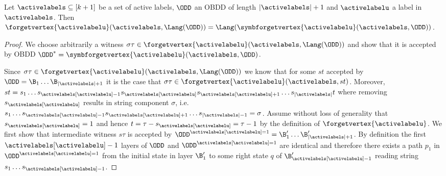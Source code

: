 \begin{lemma}
\label{lemma:SymbolicForgetVertexAppendix}
Let $\activelabels \subseteq [k+1]$ be a set of active labels, $\ODD$ an OBDD of length $|\activelabels|+1$ and $\activelabelu$ a label in $\activelabels$. Then  $\forgetvertex{\activelabelu}(\activelabels, \Lang(\ODD))  = \Lang(\symbforgetvertex{\activelabelu}(\activelabels, \ODD))$.
\end{lemma}

\begin{proof}
    We choose arbitrarily a  witness $\sigma\tau\in \forgetvertex{\activelabelu}(\activelabels,\Lang(\ODD))$ and show that it is accepted by OBDD $\ODD^* = \symbforgetvertex{\activelabelu}(\activelabels,\ODD)$.

    Since $\sigma\tau \in \forgetvertex{\activelabelu}(\activelabels,\Lang(\ODD))$ we know that for some $st$ accepted by $\ODD = \B_1\dots \B_{|\activelabels|+1}$ it is the case that $\sigma\tau \in \forgetvertex{\activelabelu}(\activelabels,st)$. Moreover, $st = s_1\dots s_{\activelabels[\activelabelu]-1}s_{\activelabels[\activelabelu]}s_{\activelabels[\activelabelu]+1}\dots s_{|\activelabels|}t$ where removing $s_{\activelabels[\activelabelu]}$ results in string component $\sigma$, i.e. $s_1\dots s_{\activelabels[\activelabelu]-1} s_{\activelabels[\activelabelu]+1}\dots s_{|\activelabels|-1} = \sigma$. Assume without loss of generality that $s_{\activelabels[\activelabelu]} = 1$ and hence $t = \tau - s_{\activelabels[\activelabelu]} = \tau - 1$ by the definition of $\forgetvertex{\activelabelu}$. We first show that intermediate witness $s\tau$ is accepted by $\ODD^{\activelabels[\activelabelu]=1} = \B_1'\dots\B_{|\activelabels|+1}'$. By definition the first $\activelabels[\activelabelu] -1$ layers of $\ODD$ and $\ODD^{\activelabels[\activelabelu]=1}$ are identical and therefore there exists a path $p_1$ in $\ODD^{\activelabels[\activelabelu]=1}$ from the initial state in layer $\B'_1$ to some right state $q$ of $\B_{\activelabels[\activelabelu]-1}'$ reading string $s_1\dots s_{\activelabels[\activelabelu]-1}$. 

\end{proof}
